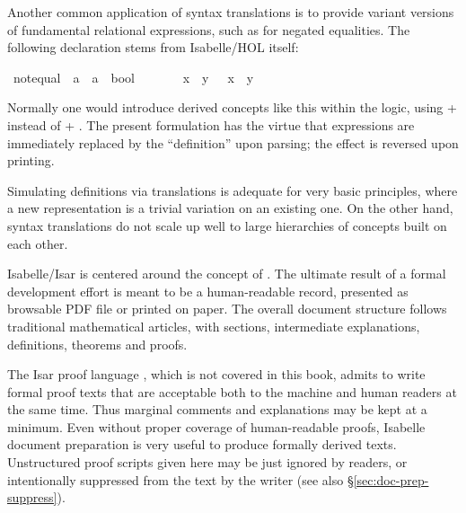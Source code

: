 \begin{isabellebody}
\begin{isamarkuptext}
  \medskip Another common application of syntax translations is to
  provide variant versions of fundamental relational expressions, such
  as \isa{{\isasymnoteq}} for negated equalities.  The following declaration
  stems from Isabelle/HOL itself:%
\end{isamarkuptext}%
\isamarkuptrue%
\ {\isachardoublequote}{\isacharunderscore}not{\isacharunderscore}equal{\isachardoublequote}\ {\isacharcolon}{\isacharcolon}\ {\isachardoublequote}{\isacharprime}a\ {\isasymRightarrow}\ {\isacharprime}a\ {\isasymRightarrow}\ bool{\isachardoublequote}\ \ \ \ {\isacharparenleft}\ {\isachardoublequote}{\isasymnoteq}{\isasymignore}{\isachardoublequote}\ {}{}{\isacharparenright}\isanewline
\isamarkupfalse%
\ {\isachardoublequote}x\ {\isasymnoteq}{\isasymignore}\ y{\isachardoublequote}\ {\isasymrightleftharpoons}\ {\isachardoublequote}{\isasymnot}\ {\isacharparenleft}x\ {\isacharequal}\ y{\isacharparenright}{\isachardoublequote}\isamarkupfalse%
%
\begin{isamarkuptext}%
\noindent Normally one would introduce derived concepts like this
  within the logic, using  + 
  instead of  + .  The
  present formulation has the virtue that expressions are immediately
  replaced by the ``definition'' upon parsing; the effect is reversed
  upon printing.

  Simulating definitions via translations is adequate for very basic
  principles, where a new representation is a trivial variation on an
  existing one.  On the other hand, syntax translations do not scale
  up well to large hierarchies of concepts built on each other.%
\end{isamarkuptext}%
\isamarkuptrue%
%
\isamarkuptrue%
%
\begin{isamarkuptext}%
Isabelle/Isar is centered around the concept of .  The ultimate result of a
  formal development effort is meant to be a human-readable record,
  presented as browsable PDF file or printed on paper.  The overall
  document structure follows traditional mathematical articles, with
  sections, intermediate explanations, definitions, theorems and
  proofs.

  The Isar proof language \cite{Wenzel-PhD}, which is not covered in
  this book, admits to write formal proof texts that are acceptable
  both to the machine and human readers at the same time.  Thus
  marginal comments and explanations may be kept at a minimum.  Even
  without proper coverage of human-readable proofs, Isabelle document
  preparation is very useful to produce formally derived texts.
  Unstructured proof scripts given here may be just ignored by
  readers, or intentionally suppressed from the text by the writer
  (see also \S\ref{sec:doc-prep-suppress}).


\end{isamarkuptext}
\end{isabellebody}
